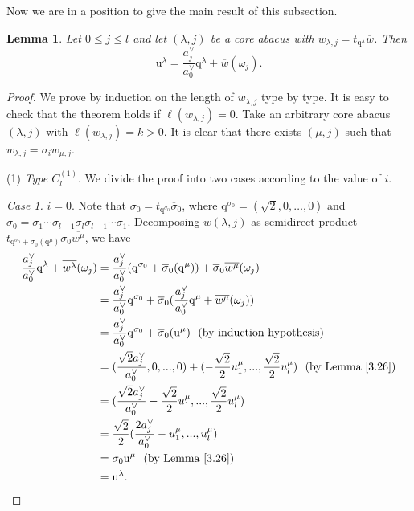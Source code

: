 \documentclass[11pt]{amsart}
\theoremstyle{plain}
\numberwithin{equation}{subsection}
\newtheorem{lemma}[theorem]{Lemma}
\newcommand{\lam}{\lambda}
\begin{document}
Now we are in a position to give the main result of this subsection.

\begin{lemma}\label{3.27}
Let $0\leq j\leq l$ and let $(\lam, j)$ be a core abacus with $w_{\lam, j}=t_{\mathrm{q}^\lam}\overline{w}$. Then 
$$\mathrm{u}^\lam=\frac{a_j^{\vee}}{a_0^{\vee}}\mathrm{q}^\lam+\overline{w}(\omega_{j}).$$
\end{lemma}

\begin{proof}
We prove by induction on the length of $w_{\lam, j}$ type by type. 
It is easy to check that the theorem holds if $\ell(w_{\lam, j})=0$. 
Take an arbitrary core abacus $(\lam, j)$ with $\ell(w_{\lam, j})=k>0$. 
It is clear that there exists $(\mu, j)$ such that $w_{\lam, j}=\sigma_iw_{\mu, j}$.

\smallskip

\noindent(1) {\em Type $C_l^{(1)}$}. We divide the proof into two cases according to the value of $i$.

{\em Case 1.} $i=0$. Note that $\sigma_0=t_{\mathrm{q}^{\sigma_0}}\overline{\sigma}_0$, where $\mathrm{q}^{\sigma_0}=(\sqrt{2}, 0, \dots, 0)$ 
and $\overline{\sigma}_0=\sigma_1 \cdots \sigma_{l-1}\sigma_l\sigma_{l-1}\cdots \sigma_1.$ 
Decomposing $w(\lam, j)$ as semidirect product $t_{\mathrm{q}^{\sigma_0}+\overline{\sigma}_0(\mathrm{q}^{\mu})}\overline{\sigma}_0\overline{w^{\mu}}$,
we have
\begin{align*}
\frac{a_j^{\vee}}{a_0^{\vee}}\mathrm{q}^\lam+\overline{w^\lam}(\omega_{j})
&=\frac{a_j^{\vee}}{a_0^{\vee}}(\mathrm{q}^{\sigma_0}+\overline{\sigma}_0(\mathrm{q}^{\mu}))+\overline{\sigma}_0\overline{w^{\mu}}(\omega_{j})\\ &=\frac{a_j^{\vee}}{a_0^{\vee}}\mathrm{q}^{\sigma_0}+\overline{\sigma}_0(\frac{a_j^{\vee}}{a_0^{\vee}}\mathrm{q}^{\mu}+\overline{w^{\mu}}(\omega_{j})) \\
& =\frac{a_j^{\vee}}{a_0^{\vee}}\mathrm{q}^{\sigma_0}+\overline{\sigma}_0(\mathrm{u}^\mu)\,\,\,\,   \text{(by induction hypothesis)}\\
&=(\frac{\sqrt{2}a_j^{\vee}}{a_0^{\vee}},0,...,0)+(-\frac{\sqrt{2}}{2}u_{1}^\mu,...,\frac{\sqrt{2}}{2}u_{l}^\mu) \,\,\,\,   \text{(by Lemma \ref{3.26})}\\
&=(\frac{\sqrt{2}a_j^{\vee}}{a_0^{\vee}}-\frac{\sqrt{2}}{2}u_{1}^\mu,...,\frac{\sqrt{2}}{2}u_{l}^\mu)\\
&=\frac{\sqrt{2}}{2}(\frac{2a_j^{\vee}}{a_0^{\vee}}-u_{1}^\mu,...,u_{l}^\mu)\\
&=\sigma_0\mathrm{u}^{\mu}\,\,\,\,   \text{(by Lemma \ref{3.26})}\\
&=\mathrm{u}^\lam.
\end{align*}


\end{proof}
\end{document}
